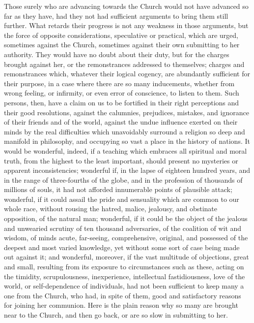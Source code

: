 Those surely who are advancing towards the Church would not have
advanced so far as they have, had they not had sufficient arguments to
bring them still further. What retards their progress is not any
weakness in those arguments, but the force of opposite considerations,
speculative or practical, which are urged, sometimes against the
Church, sometimes against their own submitting to her authority. They
would have no doubt about their duty, but for the charges brought
against her, or the remonstrances addressed to themselves; charges and
remonstrances which, whatever their logical cogency, are abundantly
sufficient for their purpose, in a case where there are so many
inducements, whether from wrong feeling, or infirmity, or even error
of conscience, to listen to them. Such persons, then, have a claim on
us to be fortified in their right perceptions and their good
resolutions, against the calumnies, prejudices, mistakes, and
ignorance of their friends and of the world, against the undue
influence exerted on their minds by the real difficulties which
unavoidably surround a religion so deep and manifold in philosophy,
and occupying so vast a place in the history of nations. It would be
wonderful, indeed, if a teaching which embraces all spiritual and
moral truth, from the highest to the least important, should present
no mysteries or apparent inconsistencies; wonderful if, in the lapse
of eighteen hundred years, and in the range of three-fourths of the
globe, and in the profession of thousands of millions of souls, it had
not afforded innumerable points of plausible attack; wonderful, if it
could assail the pride and sensuality which are common to our whole
race, without rousing the hatred, malice, jealousy, and obstinate
opposition, of the natural man; wonderful, if it could be the object
of the jealous and unwearied scrutiny of ten thousand adversaries, of
the coalition of wit and wisdom, of minds acute, far-seeing,
comprehensive, original, and possessed of the deepest and most varied
knowledge, yet without some sort of case being made out against it;
and wonderful, moreover, if the vast multitude of objections, great
and small, resulting from its exposure to circumstances such as these,
acting on the timidity, scrupulousness, inexperience, intellectual
fastidiousness, love of the world, or self-dependence of individuals,
had not been sufficient to keep many a one from the Church, who had,
in spite of them, good and satisfactory reasons for joining her
communion. Here is the plain reason why so many are brought near to
the Church, and then go back, or are so slow in submitting to her.

